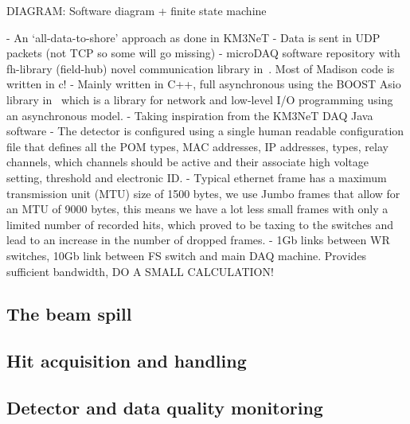 DIAGRAM: Software diagram + finite state machine

- An `all-data-to-shore' approach as done in KM3NeT
- Data is sent in UDP packets (not TCP so some will go missing)
- microDAQ software repository with fh-library (field-hub) novel communication library
in~\cite{microdaq2020}. Most of Madison code is written in c!
- Mainly written in C++, full asynchronous using the BOOST Asio library in~\cite{boost2020} which
is a library for network and low-level I/O programming using an asynchronous model.
- Taking inspiration from the KM3NeT DAQ Java software
- The detector is configured using a single human readable configuration file that defines all the
POM types, MAC addresses, IP addresses, types, relay channels, which channels should be active and
their associate high voltage setting, threshold and electronic ID.
- Typical ethernet frame has a maximum transmission unit (MTU) size of 1500 bytes, we use Jumbo
frames that allow for an MTU of 9000 bytes, this means we have a lot less small frames with only a
limited number of recorded hits, which proved to be taxing to the switches and lead to an increase
in the number of dropped frames.
- 1Gb links between WR switches, 10Gb link between FS switch and main DAQ machine. Provides
sufficient bandwidth, DO A SMALL CALCULATION!

\subsection{The beam spill} %
\label{sec:daq_soft_spill} %

\subsection{Hit acquisition and handling} %
\label{sec:daq_soft_hits} %

\subsection{Detector and data quality monitoring} %
\label{sec:daq_soft_monitor} %

